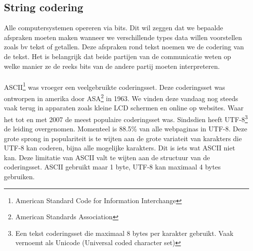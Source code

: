 \documentclass[10pt,twoside]{report}
\begin{document}
\subsection{String codering}
Alle computersystemen opereren via bits. Dit wil zeggen dat we bepaalde afspraken moeten maken wanneer we verschillende types data willen voorstellen zoals bv tekst of getallen. Deze afspraken rond tekst noemen we de codering van de tekst. Het is belangrijk dat beide partijen van de communicatie weten op welke manier ze de reeks bits van de andere partij moeten interpreteren.\\\\
ASCII\footnote{American Standard Code for Information Interchange} was vroeger een veelgebruikte coderingsset. Deze coderingsset was ontworpen in amerika door ASA\footnote{American Standards Association} in 1963. We vinden deze vandaag nog steeds vaak terug in apparaten zoals kleine LCD schermen en online op websites. Waar het tot en met 2007 de meest populaire coderingsset was. Sindsdien heeft UTF-8\footnote{Een tekst coderingsset die maximaal 8 bytes per karakter gebruikt. Vaak vernoemt als Unicode (Universal coded character set)} de leiding overgenomen. Momenteel is 88.5\% van alle webpaginas in UTF-8\cite{UnicodeStatistics}. Deze grote sprong in populariteit is te wijten aan de grote variateit van karakters die UTF-8 kan coderen, bijna alle mogelijke karakters. Dit is iets wat ASCII niet kan. Deze limitatie van ASCII valt te wijten aan de structuur van de coderingsset. ASCII gebruikt maar 1 byte, UTF-8 kan maximaal 4 bytes gebruiken.
\end{document}

